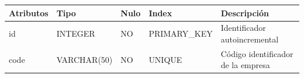 \documentclass[12pt,a4paperpaper,]{report}
\begin{document}
\begin{longtable}[]{@{}lllll@{}}
\toprule
\begin{minipage}[b]{0.21\columnwidth}\raggedright\strut
Atributos\strut
\end{minipage} & \begin{minipage}[b]{0.19\columnwidth}\raggedright\strut
Tipo\strut
\end{minipage} & \begin{minipage}[b]{0.16\columnwidth}\raggedright\strut
Nulo\strut
\end{minipage} & \begin{minipage}[b]{0.19\columnwidth}\raggedright\strut
Index\strut
\end{minipage} & \begin{minipage}[b]{0.11\columnwidth}\raggedright\strut
Descripción\strut
\end{minipage}\tabularnewline
\midrule
\endhead
\begin{minipage}[t]{0.21\columnwidth}\raggedright\strut
id\strut
\end{minipage} & \begin{minipage}[t]{0.19\columnwidth}\raggedright\strut
INTEGER\strut
\end{minipage} & \begin{minipage}[t]{0.16\columnwidth}\raggedright\strut
NO\strut
\end{minipage} & \begin{minipage}[t]{0.19\columnwidth}\raggedright\strut
PRIMARY\_KEY\strut
\end{minipage} & \begin{minipage}[t]{0.11\columnwidth}\raggedright\strut
Identificador autoincremental\strut
\end{minipage}\tabularnewline
\begin{minipage}[t]{0.21\columnwidth}\raggedright\strut
code\strut
\end{minipage} & \begin{minipage}[t]{0.19\columnwidth}\raggedright\strut
VARCHAR(50)\strut
\end{minipage} & \begin{minipage}[t]{0.16\columnwidth}\raggedright\strut
NO\strut
\end{minipage} & \begin{minipage}[t]{0.19\columnwidth}\raggedright\strut
UNIQUE\strut
\end{minipage} & \begin{minipage}[t]{0.11\columnwidth}\raggedright\strut
Código identificador de la empresa\strut

\end{minipage}
\end{longtable}
\end{document}
